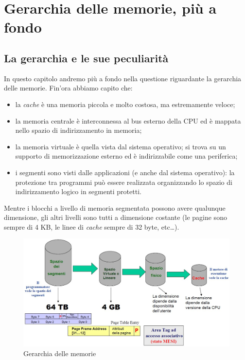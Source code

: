 
\chapter{Gerarchia delle memorie, più a fondo}
\label{cha:gerarchiaDettagli}

\section{La gerarchia e le sue peculiarità}
\label{sec:gerarchiaPeculiarità}

In questo capitolo andremo più a fondo nella questione riguardante la gerarchia delle memorie. Fin'ora abbiamo capito che:
\begin{itemize}
\item la \textit{cache} è una memoria piccola e molto costosa, ma estremamente veloce;
\item la memoria centrale è interconnessa al bus esterno della CPU ed è mappata nello spazio di indirizzamento in memoria;
\item la memoria virtuale è quella vista dal sistema operativo; si trova su un supporto di memorizzazione esterno ed è indirizzabile come una periferica;
\item i segmenti sono visti dalle applicazioni (e anche dal sistema operativo): la protezione tra programmi può
essere realizzata organizzando lo spazio di indirizzamento logico in segmenti
protetti.
\end{itemize}
Mentre i blocchi a livello di memoria segmentata possono avere qualunque dimensione, gli altri livelli sono tutti a dimensione costante (le pagine sono sempre di 4 KB, le linee di \textit{cache} sempre di 32 byte, etc\ldots).

\begin{figure}[!h]
\centering
\includegraphics[width=\columnwidth]{img/gerarchiamemorie}
\caption{Gerarchia delle memorie}
\label{fig:gerarchiamemorie}
\end{figure}

